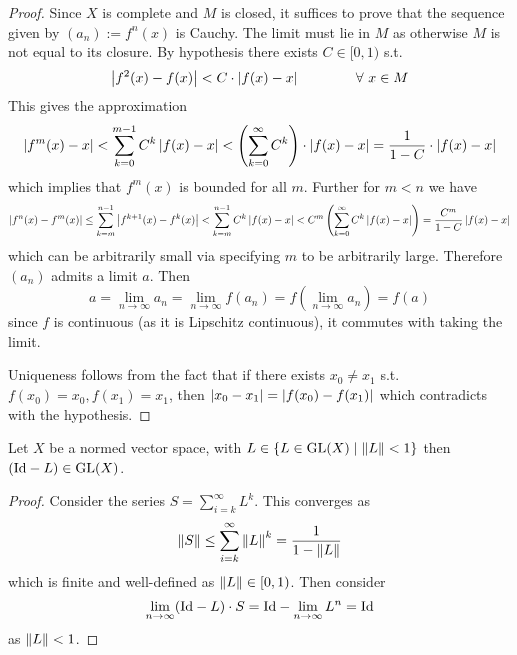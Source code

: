 \documentclass{article}
\begin{document}
\begin{proof}
    Since $X$ is complete and $M$ is closed, it suffices to prove that the sequence given by $(a_n) := f^n(x)$ is Cauchy. The limit must lie in $M$ as otherwise $M$ is not equal to its closure. By hypothesis there exists $C \in [0, 1)$ s.t.
    \[
        \left|f^2(x) - f(x)\right| < C \cdot \left|f(x) - x\right| \qquad \qquad \forall \ x \in M
    \]
    This gives the approximation
    \[
        \left|f^m(x) - x\right| < \sum_{k=0}^{m-1} C^k \left|f(x) - x\right| < \left( \sum_{k=0}^{\infty} C^k \right) \cdot \left|f(x) - x\right| = \frac{1}{1 - C} \cdot \left|f(x) - x\right|
    \]
    which implies that $f^m(x)$ is bounded for all $m$. Further for $m < n$ we have
    \[
        \left|f^n(x) - f^m(x)\right| \leq \sum_{k=m}^{n-1} \left|f^{k+1}(x) - f^k(x)\right| < \sum_{k=m}^{n-1} C^k \left|f(x) - x\right| < C^m \left(\sum_{k=0}^{\infty} C^k \left|f(x) - x\right|\right) = \frac{C^m}{1 - C}\left|f(x) - x\right|
    \]
    which can be arbitrarily small via specifying $m$ to be arbitrarily large. Therefore $(a_n)$ admits a limit $a$. Then 
    \[
        a = \lim_{n \to \infty} a_n = \lim_{n \to \infty} f(a_n) = f(\lim_{n \to \infty} a_n) = f(a)
    \]
    since $f$ is continuous (as it is Lipschitz continuous), it commutes with taking the limit.

    Uniqueness follows from the fact that if there exists $x_0 \neq x_1$ s.t. $f(x_0) = x_0, f(x_1) = x_1$, then $\left|x_0 - x_1\right| = \left|f(x_0) - f(x_1)\right|$ which contradicts with the hypothesis.
\end{proof}

\begin{lemma}\label{lem: map norm invertible}
    Let $X$ be a normed vector space, with $L \in \{L \in \mathrm{GL}(X) \mid \left\|L\right\| < 1\}$ then $(\mathrm{Id} - L) \in \mathrm{GL}(X)$. 
\end{lemma}

\begin{proof}
    Consider the series $S = \sum_{i=k}^{\infty} L^k$. This converges as
    \[
        \left\|S\right\| \leq \sum_{i=k}^{\infty} \left\|L\right\|^k = \frac{1}{1 - \left\|L\right\|}
    \]
    which is finite and well-defined as $\left\|L\right\| \in [0, 1)$. Then consider
    \[
        \lim_{n \to \infty}(\mathrm{Id} - L)\cdot S = \mathrm{Id} - \lim_{n \to \infty} L^n = \mathrm{Id}
    \]
    as $\left\|L\right\| < 1$. 
\end{proof}
\end{document}
